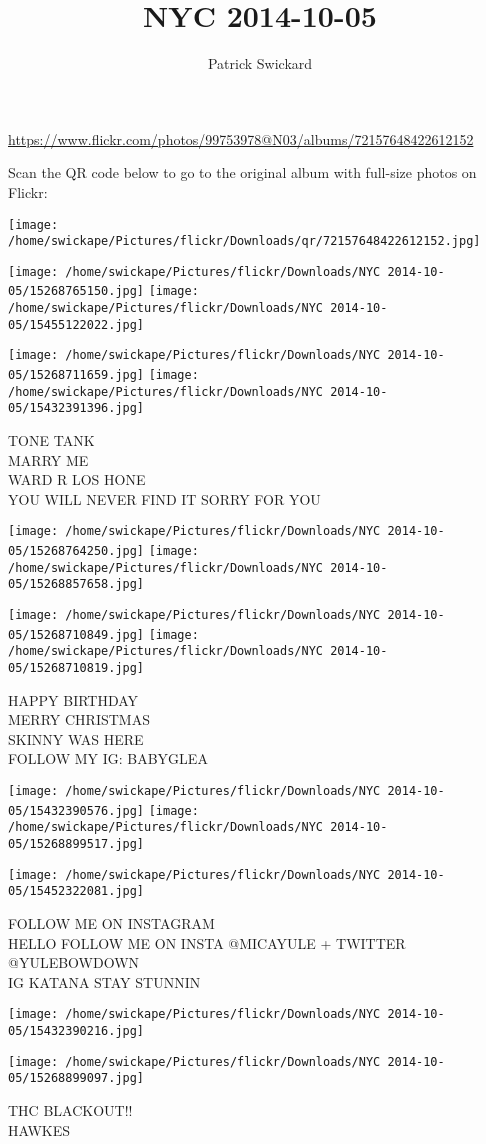 \documentclass[10pt,letterpaper]{article}
\title{NYC 2014-10-05}
\author{Patrick Swickard}
\date{}
\begin{document}
\maketitle

\url{https://www.flickr.com/photos/99753978@N03/albums/72157648422612152}

Scan the QR code below to go to the original album with full-size photos on Flickr:

\texttt{[image: /home/swickape/Pictures/flickr/Downloads/qr/72157648422612152.jpg]}
\pagebreak

\texttt{[image: /home/swickape/Pictures/flickr/Downloads/NYC 2014-10-05/15268765150.jpg]}
\texttt{[image: /home/swickape/Pictures/flickr/Downloads/NYC 2014-10-05/15455122022.jpg]}

\texttt{[image: /home/swickape/Pictures/flickr/Downloads/NYC 2014-10-05/15268711659.jpg]}
\texttt{[image: /home/swickape/Pictures/flickr/Downloads/NYC 2014-10-05/15432391396.jpg]}

TONE TANK\\
MARRY ME\\
WARD R LOS HONE\\
YOU WILL NEVER FIND IT SORRY FOR YOU
\pagebreak

\texttt{[image: /home/swickape/Pictures/flickr/Downloads/NYC 2014-10-05/15268764250.jpg]}
\texttt{[image: /home/swickape/Pictures/flickr/Downloads/NYC 2014-10-05/15268857658.jpg]}

\texttt{[image: /home/swickape/Pictures/flickr/Downloads/NYC 2014-10-05/15268710849.jpg]}
\texttt{[image: /home/swickape/Pictures/flickr/Downloads/NYC 2014-10-05/15268710819.jpg]}

HAPPY BIRTHDAY\\
MERRY CHRISTMAS\\
SKINNY WAS HERE\\
FOLLOW MY IG: BABYGLEA
\pagebreak

\texttt{[image: /home/swickape/Pictures/flickr/Downloads/NYC 2014-10-05/15432390576.jpg]}
\texttt{[image: /home/swickape/Pictures/flickr/Downloads/NYC 2014-10-05/15268899517.jpg]}

\vspace{0.25in}
\texttt{[image: /home/swickape/Pictures/flickr/Downloads/NYC 2014-10-05/15452322081.jpg]}

FOLLOW ME ON INSTAGRAM\\
HELLO FOLLOW ME ON INSTA @MICAYULE + TWITTER @YULEBOWDOWN\\
IG KATANA STAY STUNNIN
\pagebreak

\texttt{[image: /home/swickape/Pictures/flickr/Downloads/NYC 2014-10-05/15432390216.jpg]}

\vspace{0.25in}
\texttt{[image: /home/swickape/Pictures/flickr/Downloads/NYC 2014-10-05/15268899097.jpg]}

THC BLACKOUT!!\\
HAWKES
\pagebreak
\end{document}
